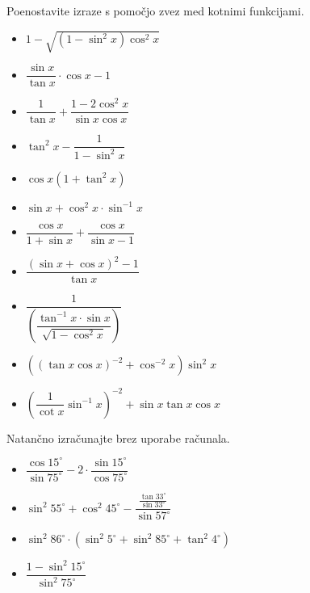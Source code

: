         
            \begin{naloga}
                Poenostavite izraze s pomočjo zvez med kotnimi funkcijami.
                \begin{itemize}
                    
                            \item $\displaystyle 1-\sqrt{\left(1-\sin^2x\right)\cos^2x} $ 
                            \item $\displaystyle \dfrac{\sin{x}}{\tan{x}}\cdot\cos{x}-1 $ 
                            \item $\displaystyle \dfrac{1}{\tan{x}}+\dfrac{1-2\cos^2{x}}{\sin{x}\cos{x}} $ 
                            \item $\displaystyle \tan^2{x}-\dfrac{1}{1-\sin^2{x}} $ 
                            \item $\displaystyle \cos{x}\left(1+\tan^2{x}\right) $ 
                            \item $\displaystyle \sin{x}+\cos^2{x}\cdot\sin^{-1}{x} $ 
                            \item $\displaystyle \dfrac{\cos{x}}{1+\sin{x}}+\dfrac{\cos{x}}{\sin{x}-1} $ 
                            \item $\displaystyle \dfrac{\left(\sin{x}+\cos{x}\right)^2-1}{\tan{x}} $ 
                            \item $\displaystyle \dfrac{1}{\left(\dfrac{\tan^{-1}{x}\cdot\sin{x}}{\sqrt{1-\cos^2{x}}}\right)} $ 
                    
                    
                            \item $\displaystyle \left(\left(\tan{x}\cos{x}\right)^{-2}+\cos^{-2}{x}\right)\sin^2{x} $ 
                            \item $\displaystyle \left(\dfrac{1}{\cot{x}}\sin^{-1}{x}\right)^{-2}+\sin{x}\tan{x}\cos{x} $ 
                    
                \end{itemize}
            \end{naloga}

        


        
            \begin{naloga}
                Natančno izračunajte brez uporabe računala.
                \begin{itemize}
                    \item $\displaystyle \dfrac{\cos{15^\circ}}{\sin{75^\circ}}-2\cdot\dfrac{\sin{15^\circ}}{\cos{75^\circ}}$ 
                    \item $\displaystyle \sin^2{55^\circ}+\cos^2{45^\circ}-\dfrac{\frac{\tan{33^\circ}}{\sin{33^\circ}}}{\sin{57^\circ}}$ 
                    \item $\displaystyle \sin^2{86^\circ}\cdot\left(\sin^2{5^\circ}+\sin^2{85^\circ}+\tan^2{4^\circ}\right)$ 
                    \item $\displaystyle \dfrac{1-\sin^2{15^\circ}}{\sin^2{75^\circ}}$ 
                \end{itemize}
            \end{naloga}

